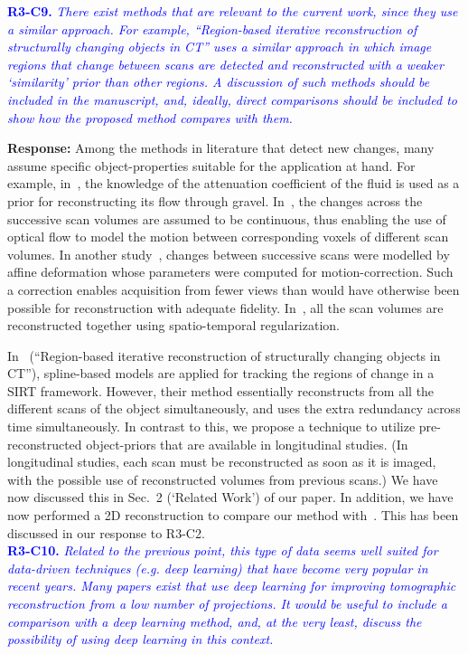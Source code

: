 \documentclass{article}
\begin{document}
\textcolor{blue}{\textbf{R3-C9.}\textit{ There exist methods that are relevant to the current work, since they use a similar approach. For example, ``Region-based iterative reconstruction of structurally changing objects in CT'' uses a similar approach in which image regions that change between scans are detected and reconstructed with a weaker `similarity' prior than other regions. A discussion of such methods should be included in the manuscript, and, ideally, direct comparisons should be included to show how the proposed method compares with them.}}

\textbf{Response:} Among the methods in literature that detect new changes, many assume specific object-properties suitable for the application at hand.  For example, in~\cite{Van2015}, the knowledge of the attenuation coefficient of the fluid is used as a prior for reconstructing its flow through gravel. In~\cite{koen2020}, the changes across the successive scan volumes are assumed to be continuous, thus enabling the use of optical flow to model the motion between corresponding voxels of different scan volumes. In another study~\cite{vincent2017}, changes between successive scans were modelled by affine deformation whose parameters were computed for motion-correction. Such a correction enables acquisition from fewer views than would have otherwise been possible for reconstruction with adequate fidelity. In~\cite{daniil2015}, all the scan volumes are reconstructed together using spatio-temporal regularization.

In~\cite{Van2014} (``Region-based iterative reconstruction of structurally changing objects in CT''), spline-based models are applied for tracking the regions of change in a SIRT framework. However, their method essentially reconstructs from all the different scans of the object simultaneously, and uses the extra redundancy across time simultaneously. In contrast to this, we propose a technique to utilize pre-reconstructed object-priors that are available in longitudinal studies. (In longitudinal studies, each scan must be reconstructed as soon as it is imaged, with the possible use of reconstructed volumes from previous scans.) 
We have now discussed this in Sec.~2 (`Related Work') of our paper.
In addition, we have now performed a 2D reconstruction to compare our method with~\cite{Lee2012}. This has been discussed in our response to R3-C2.\\

\textcolor{blue}{\textbf{R3-C10.}\textit{ Related to the previous point, this type of data seems well suited for data-driven techniques (e.g. deep learning) that have become very popular in recent years. Many papers exist that use deep learning for improving tomographic reconstruction from a low number of projections. It would be useful to include a comparison with a deep learning method, and, at the very least, discuss the possibility of using deep learning in this context.}}
    
\end{document}
